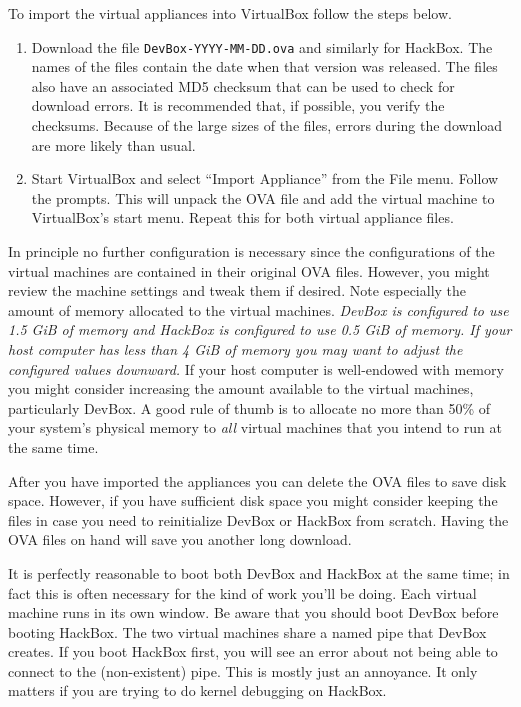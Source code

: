 \documentclass{article}
\begin{document}
To import the virtual appliances into VirtualBox follow the steps below.

\begin{enumerate}

\item Download the file \texttt{DevBox-YYYY-MM-DD.ova} and similarly for HackBox. The names of
  the files contain the date when that version was released. The files also have an associated
  MD5 checksum that can be used to check for download errors. It is recommended that, if
  possible, you verify the checksums. Because of the large sizes of the files, errors during the
  download are more likely than usual.

\item Start VirtualBox and select ``Import Appliance'' from the File menu. Follow the prompts.
  This will unpack the OVA file and add the virtual machine to VirtualBox's start menu. Repeat
  this for both virtual appliance files.

\end{enumerate}

In principle no further configuration is necessary since the configurations of the virtual
machines are contained in their original OVA files. However, you might review the machine
settings and tweak them if desired. Note especially the amount of memory allocated to the
virtual machines. \emph{DevBox is configured to use 1.5 GiB of memory and HackBox is configured
to use 0.5 GiB of memory. If your host computer has less than 4 GiB of memory you may want to
adjust the configured values downward.} If your host computer is well-endowed with memory you
might consider increasing the amount available to the virtual machines, particularly DevBox. A
good rule of thumb is to allocate no more than 50\% of your system's physical memory to
\emph{all} virtual machines that you intend to run at the same time.

After you have imported the appliances you can delete the OVA files to save disk space. However,
if you have sufficient disk space you might consider keeping the files in case you need to
reinitialize DevBox or HackBox from scratch. Having the OVA files on hand will save you another
long download.

It is perfectly reasonable to boot both DevBox and HackBox at the same time; in fact this is
often necessary for the kind of work you'll be doing. Each virtual machine runs in its own
window. Be aware that you should boot DevBox before booting HackBox. The two virtual machines
share a named pipe that DevBox creates. If you boot HackBox first, you will see an error about
not being able to connect to the (non-existent) pipe. This is mostly just an annoyance. It only
matters if you are trying to do kernel debugging on HackBox.
\end{document}
